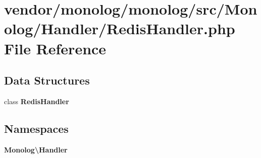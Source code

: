 \section{vendor/monolog/monolog/src/\+Monolog/\+Handler/\+Redis\+Handler.php File Reference}
\label{_redis_handler_8php}
\subsection*{Data Structures}
\begin{DoxyCompactItemize}
\item 
class {\bf Redis\+Handler}
\end{DoxyCompactItemize}
\subsection*{Namespaces}
\begin{DoxyCompactItemize}
\item 
 {\bf Monolog\textbackslash{}\+Handler}
\end{DoxyCompactItemize}
